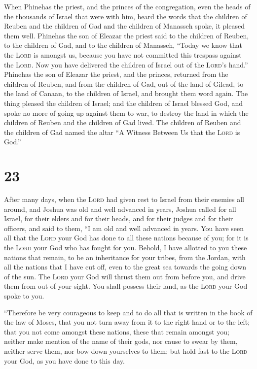  When Phinehas the priest, and the princes of the
congregation, even the heads of the thousands of Israel that were with
him, heard the words that the children of Reuben and the children of Gad
and the children of Manasseh spoke, it pleased them well.
 Phinehas the son of Eleazar the priest said to the
children of Reuben, to the children of Gad, and to the children of
Manasseh, ``Today we know that the \textsc{Lord} is amongst us, because
you have not committed this trespass against the \textsc{Lord}. Now you
have delivered the children of Israel out of the \textsc{Lord}'s hand.''
 Phinehas the son of Eleazar the priest, and the princes,
returned from the children of Reuben, and from the children of Gad, out
of the land of Gilead, to the land of Canaan, to the children of Israel,
and brought them word again.  The thing pleased the
children of Israel; and the children of Israel blessed God, and spoke no
more of going up against them to war, to destroy the land in which the
children of Reuben and the children of Gad lived.  The
children of Reuben and the children of Gad named the altar ``A Witness
Between Us that the \textsc{Lord} is God.''

\hypertarget{section-22}{%
\section{23}\label{section-22}}

 After many days, when the \textsc{Lord} had given rest to
Israel from their enemies all around, and Joshua was old and well
advanced in years,  Joshua called for all Israel, for
their elders and for their heads, and for their judges and for their
officers, and said to them, ``I am old and well advanced in years.
 You have seen all that the \textsc{Lord} your God has
done to all these nations because of you; for it is the \textsc{Lord}
your God who has fought for you.  Behold, I have allotted
to you these nations that remain, to be an inheritance for your tribes,
from the Jordan, with all the nations that I have cut off, even to the
great sea towards the going down of the sun.  The
\textsc{Lord} your God will thrust them out from before you, and drive
them from out of your sight. You shall possess their land, as the
\textsc{Lord} your God spoke to you.

 ``Therefore be very courageous to keep and to do all that
is written in the book of the law of Moses, that you not turn away from
it to the right hand or to the left;  that you not come
amongst these nations, these that remain amongst you; neither make
mention of the name of their gods, nor cause to swear by them, neither
serve them, nor bow down yourselves to them;  but hold
fast to the \textsc{Lord} your God, as you have done to this day.

